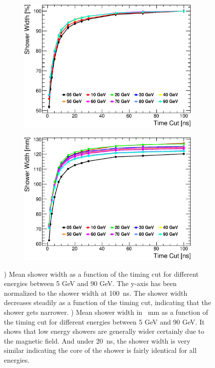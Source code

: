 \begin{figure}[htbp!]
  \centering
  \begin{subfigure}[t]{0.49\textwidth}
    \centering
    \includegraphics[width=1\linewidth]{../Thesis_Plots/ILD/NoSmearing/Plots/ShowerWidth_TimeCuts_noSmearing.eps}
    \caption{} \label{fig:ShowerWidthNoSmearing}
  \end{subfigure}
  \hfill
  \begin{subfigure}[t]{0.49\textwidth}
    \centering
    \includegraphics[width=1\linewidth]{../Thesis_Plots/ILD/NoSmearing/Plots/ShowerWidthAbso_TimeCuts_noSmearing.eps}
    \caption{} \label{fig:ShowerWidthAbsoNoSmearing}
  \end{subfigure}
  \caption{) Mean shower width as a function of the timing cut for different \kzeroL{} energies between 5 GeV and 90 GeV. The y-axis has been normalized to the shower width at \SI{100}{\nano\second}. The shower width decreases steadily as a function of the timing cut, indicating that the shower gets narrower. ) Mean shower width in \SI{}{\milli\meter} as a function of the timing cut for different \kzeroL{} energies between 5 GeV and 90 GeV. It shows that low energy showers are generally wider certainly due to the magnetic field. And under \SI{20}{\nano\second}, the shower width is very similar indicating the core of the shower is fairly identical for all energies.}
\end{figure}

